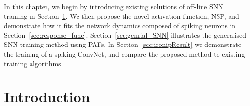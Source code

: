 In this chapter, we begin by introducing existing solutions of off-line SNN training in Section~\ref{sec:intro_NSP}.
We then propose the novel activation function, NSP, and demonstrate how it fits the network dynamics composed of spiking neurons in Section~\ref{sec:response_func}.
Section~\ref{sec:genrial_SNN} illustrates the generalised SNN training method using PAFs.
In Section~\ref{sec:iconipResult} we demonstrate the training of a spiking ConvNet, and compare the proposed method to existing training algorithms.

\section{Introduction}
\label{sec:intro_NSP}

%
%
